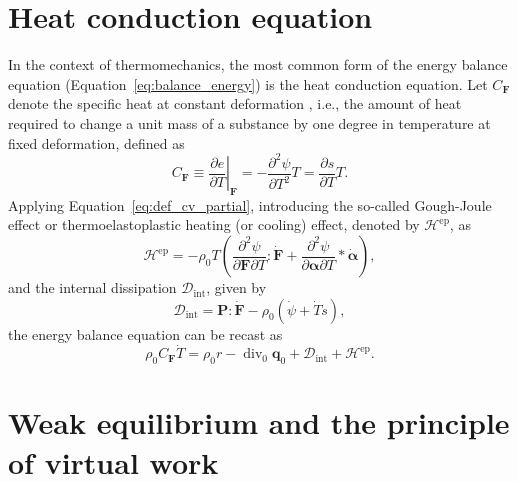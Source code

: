 \section{Heat conduction equation}
\label{sec:heat-cond-equat}

In the context of thermomechanics, the most common form of the energy balance equation (Equation~\eqref{eq:balance_energy}) is the heat conduction equation.
Let \(C_{\bm F}\) denote the specific heat at constant deformation , i.e., the amount of heat required to change a unit mass of a substance by one degree in temperature at fixed deformation, defined as
\begin{equation} \label{eq:def_cv_partial}
  C_{\bm F}\equiv \left.\frac{\partial e}{\partial T}\right|_{\bm F}=-\frac{\partial^{2} \psi}{\partial T^{2}} T=\frac{\partial s}{\partial T} T.
\end{equation}
Applying Equation~\eqref{eq:def_cv_partial}, introducing the so-called Gough-Joule effect or thermoelastoplastic heating (or cooling) effect, denoted by \(\mathcal H^\text{ep}\), as
\begin{equation}
  \label{eq:def_gough_joule_effect}
  \mathcal H^\text{ep} = - \rho_0T\left(\frac{\partial^2 \psi}{\partial \bm{F}\partial T}: \dot{\bm{F}} + \frac{\partial^2 \psi}{\partial \bm{\alpha} \partial T}*\dot{\bm{\alpha}} \right),
\end{equation}
and the internal dissipation \(\mathcal D_\text{int}\), given by
\begin{equation}
  \mathcal D_\text{int} = \bm{P}:\dot{\bm{F}} - \rho_0(\dot \psi + \dot T s),
\end{equation}
the energy balance equation can be recast as
\begin{equation}
  \label{eq:heat_conduction}
  \rho_0 C_{\bm F} \dot T = \rho_0 r - \operatorname{div}_0 \bm{q}_0 + \mathcal D_\text{int} + \mathcal H^\text{ep}.
\end{equation}

\section{Weak equilibrium and the principle of virtual work}

